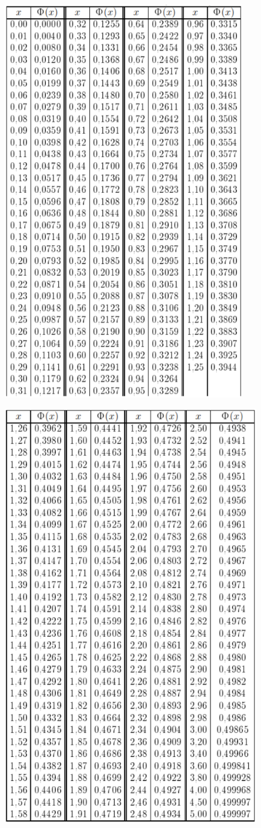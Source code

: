 \documentclass[12pt,a4paper]{article}
\theoremstyle{definition}
\theoremstyle{definition}
\theoremstyle{remark}
\theoremstyle{corollary}
\theoremstyle{bolditalic}
\begin{document}
\begin{center}
  \includegraphics[width=0.8\textwidth]{images/laplas-table-1.png}
\end{center}
\begin{center}
  \includegraphics[width=0.85\textwidth]{images/laplas-table-2.png}
\end{center}
\end{document}
